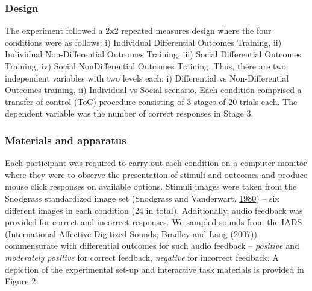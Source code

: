 \documentclass[]{elsarticle} %
\begin{document}
\hypertarget{design}{%
\subsubsection{Design}\label{design}}

The experiment followed a 2x2 repeated measures design where the four
conditions were as follows: i) Individual Differential Outcomes
Training, ii) Individual Non-Differential Outcomes Training, iii) Social
Differential Outcomes Training, iv) Social NonDifferential Outcomes
Training. Thus, there are two independent variables with two levels
each: i) Differential vs Non-Differential Outcomes training, ii)
Individual vs Social scenario. Each condition comprised a transfer of
control (ToC) procedure consisting of 3 stages of 20 trials each. The
dependent variable was the number of correct responses in Stage 3.

\hypertarget{materials-and-apparatus}{%
\subsubsection{Materials and apparatus}\label{materials-and-apparatus}}

Each participant was required to carry out each condition on a computer
monitor where they were to observe the presentation of stimuli and
outcomes and produce mouse click responses on available options. Stimuli
images were taken from the Snodgrass standardized image set (Snodgrass
and Vanderwart, \protect\hyperlink{ref-snodgrass1980standardized}{1980})
-- six different images in each condition (24 in total). Additionally,
audio feedback was provided for correct and incorrect responses. We
sampled sounds from the IADS (International Affective Digitized Sounds;
Bradley and Lang
(\protect\hyperlink{ref-bradley2007international}{2007})) commensurate
with differential outcomes for such audio feedback -- \emph{positive}
and \emph{moderately positive} for correct feedback, \emph{negative} for
incorrect feedback. A depiction of the experimental set-up and
interactive task materials is provided in Figure 2.
\end{document}
